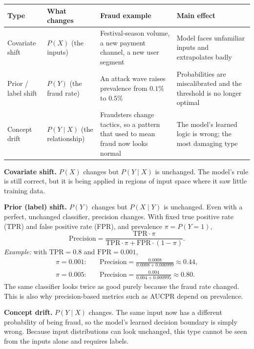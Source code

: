\documentclass[11pt]{article}
\begin{document}
\begin{center}
\begin{tabular}{|p{2.4cm}|p{2.4cm}|p{4.5cm}|p{4.5cm}|}
\hline
\textbf{Type} & \textbf{What changes} & \textbf{Fraud example} & \textbf{Main effect} \\
\hline
Covariate shift & \(P(X)\) (the inputs) & Festival-season volume, a new payment channel, a new user segment & Model faces unfamiliar inputs and extrapolates badly \\
\hline
Prior / label shift & \(P(Y)\) (the fraud rate) & An attack wave raises prevalence from \(0.1\%\) to \(0.5\%\) & Probabilities are miscalibrated and the threshold is no longer optimal \\
\hline
Concept drift & \(P(Y\mid X)\) (the relationship) & Fraudsters change tactics, so a pattern that used to mean fraud now looks normal & The model's learned logic is wrong; the most damaging type \\
\hline
\end{tabular}
\end{center}

\textbf{Covariate shift.} \(P(X)\) changes but \(P(Y\mid X)\) is unchanged. The model's rule is still correct, but it is being applied in regions of input space where it saw little training data.

\textbf{Prior (label) shift.} \(P(Y)\) changes but \(P(X\mid Y)\) is unchanged. Even with a perfect, unchanged classifier, precision changes. With fixed true positive rate (TPR) and false positive rate (FPR), and prevalence \(\pi=P(Y=1)\),
\[
\text{Precision}=\frac{\text{TPR}\cdot\pi}{\text{TPR}\cdot\pi+\text{FPR}\cdot(1-\pi)}.
\]
\emph{Example:} with \(\text{TPR}=0.8\) and \(\text{FPR}=0.001\),
\[
\begin{aligned}
\pi=0.001:&\quad \text{Precision}=\frac{0.0008}{0.0008+0.000999}\approx 0.44,\\[2pt]
\pi=0.005:&\quad \text{Precision}=\frac{0.004}{0.004+0.000995}\approx 0.80.
\end{aligned}
\]
The same classifier looks twice as good purely because the fraud rate changed. This is also why precision-based metrics such as AUCPR depend on prevalence.

\textbf{Concept drift.} \(P(Y\mid X)\) changes. The same input now has a different probability of being fraud, so the model's learned decision boundary is simply wrong. Because input distributions can look unchanged, this type cannot be seen from the inputs alone and requires labels.
\end{document}
